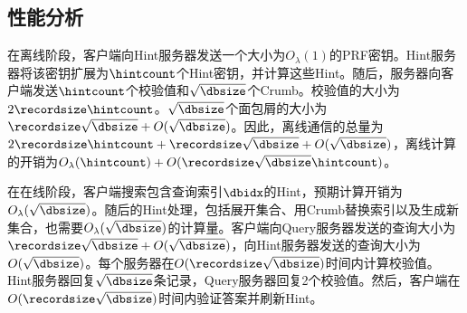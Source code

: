 


\subsection{性能分析}
在离线阶段，客户端向Hint服务器发送一个大小为$O_\lambda(1)$的PRF密钥。Hint服务器将该密钥扩展为$\hintcount$个Hint密钥，并计算这些Hint。随后，服务器向客户端发送$\hintcount$个校验值和$\sqrt{\dbsize}$个Crumb。校验值的大小为$2\recordsize\hintcount$。$\sqrt{\dbsize}$个面包屑的大小为$\recordsize\sqrt{\dbsize} + O(\sqrt{\dbsize})$。因此，离线通信的总量为$2\recordsize\hintcount + \recordsize\sqrt{\dbsize} + O(\sqrt{\dbsize})$，离线计算的开销为$O_\lambda(\hintcount) + O(\recordsize\sqrt{\dbsize}\hintcount)$。

在在线阶段，客户端搜索包含查询索引$\dbidx$的Hint，预期计算开销为$O_\lambda(\sqrt{\dbsize})$。随后的Hint处理，包括展开集合、用Crumb替换索引以及生成新集合，也需要$O_\lambda(\sqrt{\dbsize})$的计算量。客户端向Query服务器发送的查询大小为$\recordsize\sqrt{\dbsize} + O(\sqrt{\dbsize})$，向Hint服务器发送的查询大小为$O(\sqrt{\dbsize})$。每个服务器在$O(\recordsize\sqrt{\dbsize})$时间内计算校验值。Hint服务器回复$\sqrt{\dbsize}$条记录，Query服务器回复2个校验值。然后，客户端在$O(\recordsize\sqrt{\dbsize})$时间内验证答案并刷新Hint。

